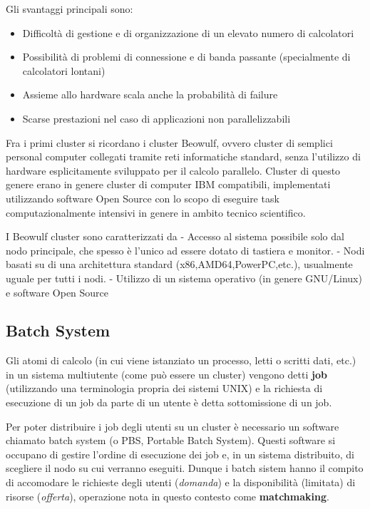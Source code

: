 Gli svantaggi principali sono:

\begin{itemize}
\tightlist
\item
  Difficoltà di gestione e di organizzazione di un elevato numero di
  calcolatori
\item
  Possibilità di problemi di connessione e di banda passante
  (specialmente di calcolatori lontani)
\item
  Assieme allo hardware scala anche la probabilità di failure
\item
  Scarse prestazioni nel caso di applicazioni non parallelizzabili
\end{itemize}

Fra i primi cluster si ricordano i cluster Beowulf, ovvero cluster di
semplici personal computer collegati tramite reti informatiche standard,
senza l'utilizzo di hardware esplicitamente sviluppato per il calcolo
parallelo. Cluster di questo genere erano in genere cluster di computer
IBM compatibili, implementati utilizzando software Open Source con lo
scopo di eseguire task computazionalmente intensivi in genere in ambito
tecnico scientifico.

I Beowulf cluster sono caratterizzati da - Accesso al sistema possibile
solo dal nodo principale, che spesso è l'unico ad essere dotato di
tastiera e monitor. - Nodi basati su di una architettura standard
(x86,AMD64,PowerPC,etc.), usualmente uguale per tutti i nodi. - Utilizzo
di un sistema operativo (in genere GNU/Linux) e software Open Source

\subsection{Batch System}\label{batch-system}

Gli atomi di calcolo (in cui viene istanziato un processo, letti o
scritti dati, etc.) in un sistema multiutente (come può essere un
cluster) vengono detti \textbf{job} (utilizzando una terminologia
propria dei sistemi UNIX) e la richiesta di esecuzione di un job da
parte di un utente è detta sottomissione di un job.

Per poter distribuire i job degli utenti su un cluster è necessario un
software chiamato batch system (o PBS, Portable Batch System). Questi
software si occupano di gestire l'ordine di esecuzione dei job e, in un
sistema distribuito, di scegliere il nodo su cui verranno eseguiti.
Dunque i batch sistem hanno il compito di accomodare le richieste degli
utenti (\emph{domanda}) e la disponibilità (limitata) di risorse
(\emph{offerta}), operazione nota in questo contesto come
\textbf{matchmaking}.

